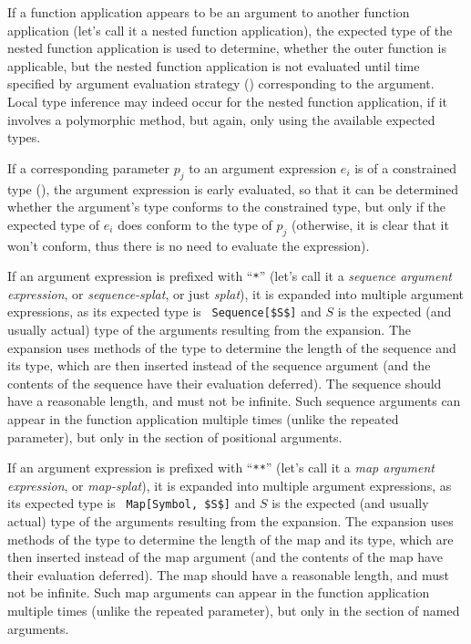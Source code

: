 If a function application appears to be an argument to another function application (let's call it a nested function application), the expected type of the nested function application is used to determine, whether the outer function is applicable, but the nested function application is not evaluated until time specified by argument evaluation strategy () corresponding to the argument. Local type inference may indeed occur for the nested function application, if it involves a polymorphic method, but again, only using the available expected types. 

If a corresponding parameter $p_j$ to an argument expression $e_i$ is of a constrained type (), the argument expression is early evaluated, so that it can be determined whether the argument's type conforms to the constrained type, but only if the expected type of $e_i$ does conform to the type of $p_j$ (otherwise, it is clear that it won't conform, thus there is no need to evaluate the expression). 

If an argument expression is prefixed with ``\lstinline!*!'' (let's call it a {\em sequence argument expression}, or {\em sequence-splat}, or just {\em splat}), it is expanded into multiple argument expressions, as its expected type is ~\lstinline!Sequence[$S$]! and $S$ is the expected (and usually actual) type of the arguments resulting from the expansion. The expansion uses methods of the  type to determine the length of the sequence and its type, which are then inserted instead of the sequence argument (and the contents of the sequence have their evaluation deferred). The sequence should have a reasonable length, and must not be infinite. Such sequence arguments can appear in the function application multiple times (unlike the repeated parameter), but only in the section of positional arguments. 

If an argument expression is prefixed with ``\lstinline!**!'' (let's call it a {\em map argument expression}, or {\em map-splat}), it is expanded into multiple argument expressions, as its expected type is ~\lstinline!Map[Symbol, $S$]! and $S$ is the expected (and usually actual) type of the arguments resulting from the expansion. The expansion uses methods of the  type to determine the length of the map and its type, which are then inserted instead of the map argument (and the contents of the map have their evaluation deferred). The map should have a reasonable length, and must not be infinite. Such map arguments can appear in the function application multiple times (unlike the repeated parameter), but only in the section of named arguments. 

